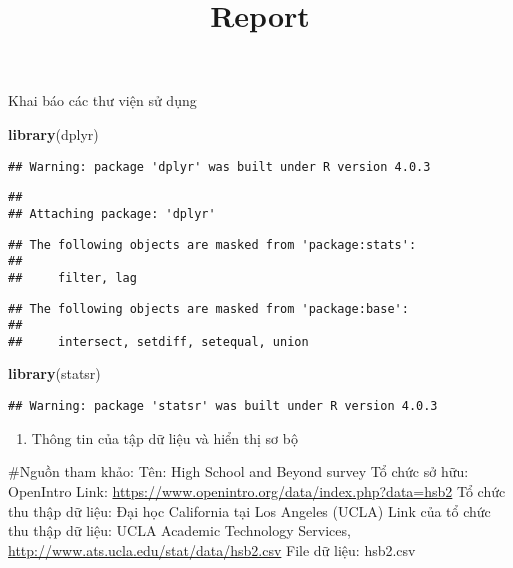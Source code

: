 \documentclass[
]{article}
\title{Report}
\author{}
\date{\vspace{-2.5em}}
\newenvironment{Shaded}{\begin{snugshade}}{\end{snugshade}}
\newcommand{\KeywordTok}[1]{\textcolor[rgb]{0.13,0.29,0.53}{\textbf{#1}}}
\newcommand{\NormalTok}[1]{#1}
\providecommand{\tightlist}{%
  \setlength{\itemsep}{0pt}\setlength{\parskip}{0pt}}
\begin{document}
\maketitle

Khai báo các thư viện sử dụng

\begin{Shaded}
\begin{Highlighting}[]
\KeywordTok{library}\NormalTok{(dplyr)}
\end{Highlighting}
\end{Shaded}

\begin{verbatim}
## Warning: package 'dplyr' was built under R version 4.0.3
\end{verbatim}

\begin{verbatim}
## 
## Attaching package: 'dplyr'
\end{verbatim}

\begin{verbatim}
## The following objects are masked from 'package:stats':
## 
##     filter, lag
\end{verbatim}

\begin{verbatim}
## The following objects are masked from 'package:base':
## 
##     intersect, setdiff, setequal, union
\end{verbatim}

\begin{Shaded}
\begin{Highlighting}[]
\KeywordTok{library}\NormalTok{(statsr)}
\end{Highlighting}
\end{Shaded}

\begin{verbatim}
## Warning: package 'statsr' was built under R version 4.0.3
\end{verbatim}

\begin{enumerate}
\def\labelenumi{\arabic{enumi}.}
\tightlist
\item
  Thông tin của tập dữ liệu và hiển thị sơ bộ
\end{enumerate}

\#Nguồn tham khảo: Tên: High School and Beyond survey Tổ chức sở hữu:
OpenIntro Link: \url{https://www.openintro.org/data/index.php?data=hsb2}
Tổ chức thu thập dữ liệu: Đại học California tại Los Angeles (UCLA) Link
của tổ chức thu thập dữ liệu: UCLA Academic Technology Services,
\url{http://www.ats.ucla.edu/stat/data/hsb2.csv} File dữ liệu: hsb2.csv
\end{document}
